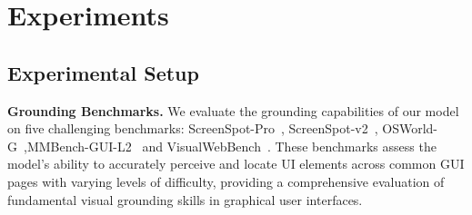 \section{Experiments}

\subsection{Experimental Setup}

\noindent\textbf{Grounding Benchmarks.}
We evaluate the grounding capabilities of our model on five challenging benchmarks: ScreenSpot-Pro~\cite{li2025screenspotpro}, ScreenSpot-v2~\cite{wu2024atlas}, OSWorld-G~\cite{wu2024atlas},MMBench-GUI-L2~\cite{wang2025mmbench} and VisualWebBench~\cite{liu2024visualwebbench_vwb}. These benchmarks assess the model's ability to accurately perceive and locate UI elements across common GUI pages with varying levels of difficulty, providing a comprehensive evaluation of fundamental visual grounding skills in graphical user interfaces.


\begin{table}[t]
\centering
\captionsetup{justification=justified, singlelinecheck=false}
\caption{Model Performance on Multiple GUI-grounding Benchmarks. 
Best results are in \textbf{bold}, second best are \underline{underlined}.}
\label{tab:gui_benchmark_performance}
\end{table}


